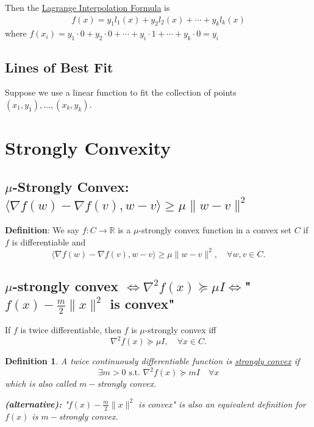 \documentclass[11pt,a4paper]{article}
\newtheorem{definition}{Definition}
\begin{document}
Then the \underline{Lagrange Interpolation Formula} is
\begin{equation}
    \begin{aligned}
        f(x)=y_1l_1(x)+y_2l_2(x)+\cdots+y_kl_k(x)
    \end{aligned}
    \nonumber
\end{equation}
where $f(x_i)=y_1\cdot 0+y_2\cdot 0+\cdots +y_i\cdot 1+\cdots+y_k\cdot 0=y_i$

\subsection{Lines of Best Fit}
Suppose we use a linear function to fit the collection of points $(x_1,y_1),...,(x_k,y_k)$.




























\section{Strongly Convexity}
\subsection{$\mu$-Strongly Convex: $
\langle\nabla f(w)-\nabla f(v), w-v\rangle \geq \mu\|w-v\|^{2}$}
\textbf{Definition}: We say $f: C \rightarrow \mathbb{R}$ is a $\mu$-strongly convex function in a convex set $C$ if $f$ is differentiable and
$$
\langle\nabla f(w)-\nabla f(v), w-v\rangle \geq \mu\|w-v\|^{2}, \quad \forall w, v \in C .
$$
\subsection{$\mu$-strongly convex $\Leftrightarrow \nabla^{2} f(x) \succeq \mu I\Leftrightarrow$"$f(x)-\frac{m}{2}\|x\|^2$ is convex"}
If $f$ is twice differentiable, then $f$ is $\mu$-strongly convex iff
$$
\nabla^{2} f(x) \succeq \mu I, \quad \forall x \in C .
$$
\begin{definition}
    A twice continuously differentiable function is \underline{strongly convex} if $$\exists m>0\text{ s.t. }\nabla^2 f(x)\succeq mI\quad \forall x$$
    which is also called $m-$strongly convex.

    \textbf{(alternative):} "$f(x)-\frac{m}{2}\|x\|^2$ is convex" is also an equivalent definition for $f(x)$ is $m-$strongly convex.
\end{definition}
\end{document}
